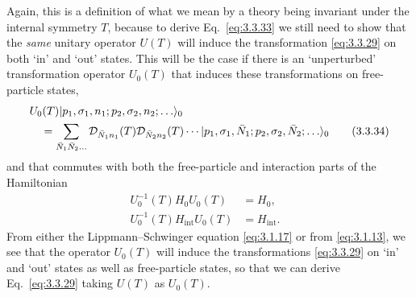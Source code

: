 Again, this is a definition of what we mean by a theory being invariant under the
internal symmetry $T$, because to derive Eq.~\eqref{eq:3.3.33} we still need to show that
the \textit{same} unitary operator $U(T)$ will induce the transformation \eqref{eq:3.3.29}
on both `in' and `out' states. This will be the case if there is an `unperturbed'
transformation operator $U_0(T)$ that induces these transformations on
free-particle states,
\begin{align}
&U_0(T)\lvert p_1,\sigma_1,n_1;p_2,\sigma_2,n_2;\ldots\rangle_0
\nonumber\\
&\quad=\sum_{\bar N_1\bar N_2\ldots}
\mathcal{D}_{\bar N_1n_1}(T)\mathcal{D}_{\bar N_2n_2}(T)\cdots
\lvert p_1,\sigma_1,\bar N_1;p_2,\sigma_2,\bar N_2;\ldots\rangle_0
\tag{3.3.34}\label{eq:3.3.34}
\end{align}
and that commutes with both the free-particle and interaction parts of the
Hamiltonian
\begin{align}
U_0^{-1}(T)H_0U_0(T)&=H_0,
&\tag{3.3.35}\label{eq:3.3.35}\\
U_0^{-1}(T)H_{\mathrm{int}}U_0(T)&=H_{\mathrm{int}}.
&\tag{3.3.36}\label{eq:3.3.36}
\end{align}
From either the Lippmann--Schwinger equation \eqref{eq:3.1.17} or from \eqref{eq:3.1.13}, we see
that the operator $U_0(T)$ will induce the transformations \eqref{eq:3.3.29} on `in' and
`out' states as well as free-particle states, so that we can derive Eq.~\eqref{eq:3.3.29}
taking $U(T)$ as $U_0(T)$.

